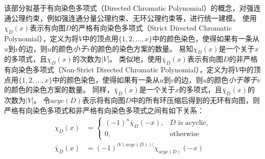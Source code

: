 \documentclass[12pt,UTF8,AutoFakeBold=3,a4paper]{ctexart} %
\begin{document}
该部分拟基于有向染色多项式（Directed Chromatic Polynomial）的概念，对强连通公理约束，例如强连通分量公理约束、无环公理约束等，进行统一建模。
使用$\chi_D(x)$表示有向图$D$的严格有向染色多项式（Strict Directed Chromatic Polynomial），定义为将$V$中的顶点用$\{1, 2, \dots, x\}$中的颜色染色，使得如果有一条从$u$到$v$的边，则$u$的颜色\emph{小于}$v$的颜色的染色方案的数量。
易知$\chi_D(x)$是一个关于$x$的多项式，且$\chi_D(x)$的次数为$|V|$。
类似地，使用$\bar \chi_D(x)$表示有向图$D$的非严格有向染色多项式（Non-Strict Directed Chromatic Polynomial），定义为将$V$中的顶点用$\{1, 2, \dots, x\}$中的颜色染色，使得如果有一条从$u$到$v$的边，则$u$的颜色\emph{小于等于}$v$的颜色的染色方案的数量。
同样，$\bar \chi_D(x)$是一个关于$x$的多项式，且$\bar \chi_D(x)$的次数为$|V|$。
令$acyc(D)$表示将有向图$D$中的所有环压缩后得到的无环有向图，则严格有向染色多项式和非严格有向染色多项式之间有如下关系：
\begin{equation*}
\begin{aligned}
\chi_D(x) &= \begin{cases}
    (-1)^n \bar \chi_D(-x), & D \text{ is acyclic,} \\
    0, & \text{otherwise}
    \end{cases} \\
\bar \chi_D(x) &= (-1)^{|V(acyc(D))|} \chi_{acyc(D)}(-x)
\end{aligned}
\end{equation*}
\end{document}
